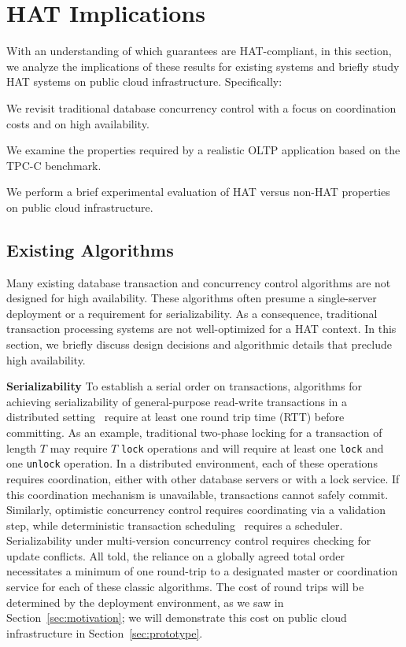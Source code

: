 
\section{HAT Implications}
\label{sec:evaluation}

With an understanding of which guarantees are HAT-compliant, in this
section, we analyze the implications of these results for existing
systems and briefly study HAT systems on public cloud
infrastructure. Specifically:

\begin{myenumerate}\vspace{-.5em}
\item We revisit traditional database concurrency control with a focus
  on coordination costs and on high availability.
\item We examine the properties required by a realistic OLTP
  application based on the TPC-C benchmark.
\item We perform a brief experimental evaluation of HAT versus non-HAT
  properties on public cloud infrastructure.
\end{myenumerate}\vspace{-.5em}

\subsection{Existing Algorithms}

Many existing database transaction and concurrency control algorithms
are not designed for high availability. These algorithms often presume
a single-server deployment or a requirement for serializability. As
a consequence, traditional transaction processing systems are not
well-optimized for a HAT context. In this section, we briefly discuss
design decisions and algorithmic details that preclude high
availability.

\vspace{.5em}\noindent\textbf{Serializability} To establish a serial
order on transactions, algorithms for achieving serializability of
general-purpose read-write transactions in a distributed
setting~\cite{bernstein-book} require at least one round trip time
(RTT) before committing. As an example, traditional two-phase locking
for a transaction of length $T$ may require $T$ \texttt{lock}
operations and will require at least one \texttt{lock} and one
\texttt{unlock} operation.  In a distributed environment, each of
these operations requires coordination, either with other database
servers or with a lock service. If this coordination mechanism is
unavailable, transactions cannot safely commit. Similarly, optimistic
concurrency control requires coordinating via a validation step, while
deterministic transaction scheduling~\cite{deterministic-scheduling}
requires a scheduler. Serializability under multi-version concurrency
control requires checking for update conflicts. All told, the reliance
on a globally agreed total order necessitates a minimum of one
round-trip to a designated master or coordination service for each of
these classic algorithms.  The cost of round trips will be determined
by the deployment environment, as we saw in
Section~\ref{sec:motivation}; we will demonstrate this cost on public
cloud infrastructure in Section~\ref{sec:prototype}.

